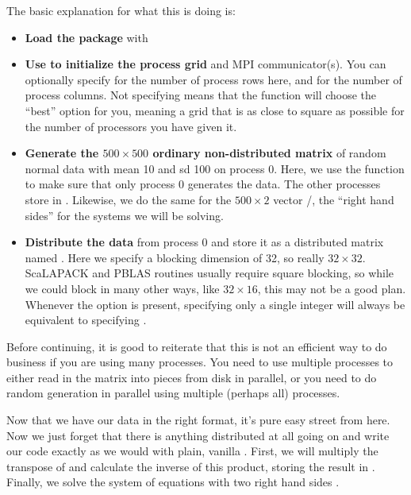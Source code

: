The basic explanation for what this is doing is:
\begin{itemize}
 \item \textbf{Load the package} with 
 \item \textbf{Use  to initialize the process grid} and MPI communicator(s).  You can optionally specify  for the number of process rows here, and  for the number of process columns.  Not specifying means that the function will choose the ``best'' option for you, meaning a grid that is as close to square as possible for the number of processors you have given it.
 \item \textbf{Generate the $500\times 500$ ordinary non-distributed  matrix} of random normal data with mean 10 and sd 100 on process 0.  Here, we use the  function  to make sure that only process 0 generates the data.  The other processes store  in .  Likewise, we do the same for the $500\times 2$ vector /, the ``right hand sides'' for the systems we will be solving.
 \item \textbf{Distribute the data} from process 0 and store it as a distributed matrix named .  Here we specify a blocking dimension of 32, so really $32\times 32$.  ScaLAPACK and PBLAS routines usually require square blocking, so while we could block in many other ways, like $32\times 16$, this may not be a good plan.   Whenever the  option is present, specifying only a single integer  will always be equivalent to specifying .
\end{itemize}

Before continuing, it is good to reiterate that this is not an efficient way to do business if you are using many processes.  You need to use multiple processes to either read in the matrix into pieces from disk in parallel, or you need to do random generation in parallel using multiple (perhaps all) processes.

Now that we have our data in the right format, it's pure easy street from here.  Now we just forget that there is anything distributed at all going on and write our code exactly as we would with plain, vanilla .  First, we will multiply the transpose of  and calculate the inverse of this product, storing the result in .  Finally, we solve the system of equations with two right hand sides .

